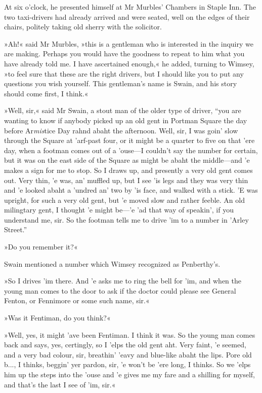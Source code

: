 At six o'clock, he presented himself at Mr Murbles' Chambers in Staple Inn. The two taxi-drivers had already arrived and were seated, well on the edges of their chairs, politely taking old sherry with the solicitor.

»Ah!« said Mr Murbles, »this is a gentleman who is interested in the inquiry we are making. Perhaps you would have the goodness to repeat to him what you have already told me. I have ascertained enough,« he added, turning to Wimsey, »to feel sure that these are the right drivers, but I should like you to put any questions you wish yourself. This gentleman's name is Swain, and his story should come first, I think.«

»Well, sir,« said Mr Swain, a stout man of the older type of driver, \enquote{you are wanting to know if anybody picked up an old gent in Portman Square the day before Ar\textit{mis}tice Day rahnd abaht the afternoon. Well, sir, I was goin' slow through the Square at 'arf-past four, or it might be a quarter to five on that 'ere day, when a footman comes out of a 'ouse\allowbreak---\allowbreak I couldn't say the number for certain, but it was on the east side of the Square as might be abaht the middle\allowbreak---\allowbreak and 'e makes a sign for me to stop. So I draws up, and presently a very old gent comes out. Very thin, 'e was, an' muffled up, but I see 'is legs and they was very thin and 'e looked abaht a 'undred an' two by 'is face, and walked with a stick. 'E was upright, for such a very old gent, but 'e moved slow and rather feeble. An old milingtary gent, I thought 'e might be---'e 'ad that way of speakin', if you understand me, sir. So the footman tells me to drive 'im to a number in 'Arley Street.}

»Do you remember it?«

Swain mentioned a number which Wimsey recognized as Penberthy's.

»So I drives 'im there. And 'e asks me to ring the bell for 'im, and when the young man comes to the door to ask if the doctor could please see General Fenton, or Fennimore or some such name, sir.«

»Was it Fentiman, do you think?«

»Well, yes, it might 'ave been Fentiman. I think it was. So the young man comes back and says, yes, certingly, so I 'elps the old gent aht. Very faint, 'e seemed, and a very bad colour, sir, breathin' 'eavy and blue-like abaht the lips. Pore old b..., I thinks, beggin' yer pardon, sir, 'e won't be 'ere long, I thinks. So we 'elps him up the steps into the 'ouse and 'e gives me my fare and a shilling for myself, and that's the last I see of 'im, sir.«

